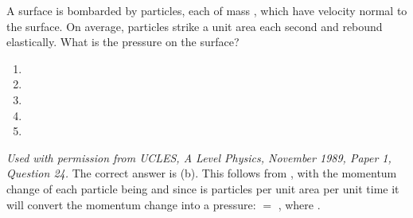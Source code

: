 
\begin{problem}
{A surface is bombarded by particles, each of mass , which have velocity  normal to the surface. On average,  particles strike a unit area each second and rebound elastically. What is the pressure on the surface?
\begin{enumerate}
	\item {}
	\item {}
	\item {}
	\item {}
	\item {}
\end{enumerate}
}
{\textit{Used with permission from UCLES, A Level Physics, November 1989, Paper 1, Question 24.}}
{The correct answer is (b). This follows from , with the momentum change of each particle being \value{(mv) - (-mv)}{2mv}{} and since  is particles per unit area per unit time it will convert the momentum change into a pressure:  $=$  , where .
}
\end{problem}